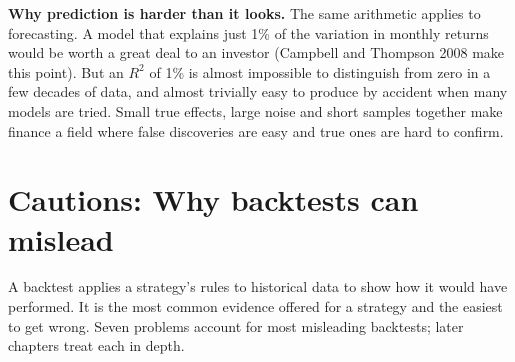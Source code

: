 
\textbf{Why prediction is harder than it looks.} The same arithmetic applies to forecasting. A model that explains just 1\% of the variation in monthly returns would be worth a great deal to an investor (Campbell and Thompson 2008 make this point). But an $R^2$ of 1\% is almost impossible to distinguish from zero in a few decades of data, and almost trivially easy to produce by accident when many models are tried. Small true effects, large noise and short samples together make finance a field where false discoveries are easy and true ones are hard to confirm.

\section{Cautions: Why backtests can mislead}
\label{sec:01-backtests}

A backtest applies a strategy's rules to historical data to show how it would have performed. It is the most common evidence offered for a strategy and the easiest to get wrong. Seven problems account for most misleading backtests; later chapters treat each in depth.

